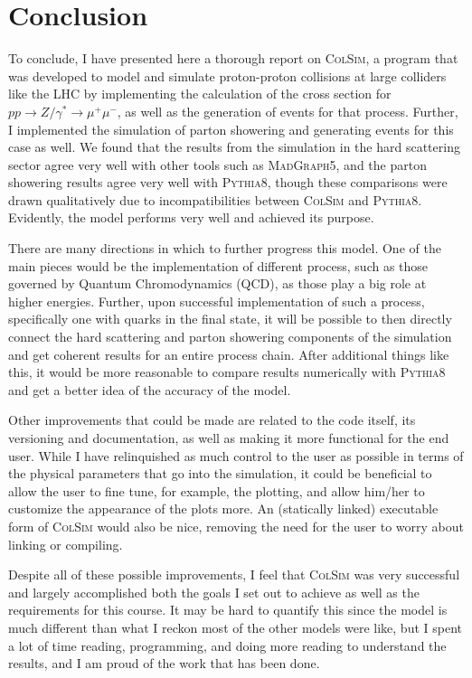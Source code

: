 \section{Conclusion}

To conclude, I have presented here a thorough report on \textsc{ColSim}, a program that was developed to model and simulate proton-proton collisions at large colliders like the LHC by implementing the calculation of the cross section for $pp \rightarrow Z/\gamma^* \rightarrow \mu^+\mu^-$, as well as the generation of events for that process. Further, I implemented the simulation of parton showering and generating events for this case as well. We found that the results from the simulation in the hard scattering sector agree very well with other tools such as \textsc{MadGraph5}, and the parton showering results agree very well with \textsc{Pythia8}, though these comparisons were drawn qualitatively due to incompatibilities between \textsc{ColSim} and \textsc{Pythia8}. Evidently, the model performs very well and achieved its purpose.

There are many directions in which to further progress this model. One of the main pieces would be the implementation of different process, such as those governed by Quantum Chromodynamics (QCD), as those play a big role at higher energies. Further, upon successful implementation of such a process, specifically one with quarks in the final state, it will be possible to then directly connect the hard scattering and parton showering components of the simulation and get coherent results for an entire process chain. After additional things like this, it would be more reasonable to compare results numerically with \textsc{Pythia8} and get a better idea of the accuracy of the model. 

Other improvements that could be made are related to the code itself, its versioning and documentation, as well as making it more functional for the end user. While I have relinquished as much control to the user as possible in terms of the physical parameters that go into the simulation, it could be beneficial to allow the user to fine tune, for example, the plotting, and allow him/her to customize the appearance of the plots more. An (statically linked) executable form of \textsc{ColSim} would also be nice, removing the need for the user to worry about linking or compiling.

Despite all of these possible improvements, I feel that \textsc{ColSim} was very successful and largely accomplished both the goals I set out to achieve as well as the requirements for this course. It may be hard to quantify this since the model is much different than what I reckon most of the other models were like, but I spent a lot of time reading, programming, and doing more reading to understand the results, and I am proud of the work that has been done.



